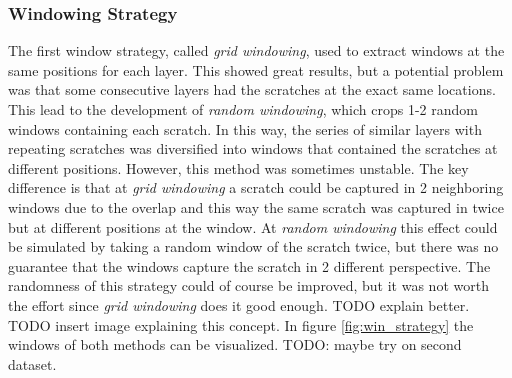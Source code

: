 \subsubsection{Windowing Strategy}
The first window strategy, called \textit{grid windowing}, used to extract windows at the same positions for each layer. This showed great results, but a potential problem was that some consecutive layers had the scratches at the exact same locations. This lead to the development of \textit{random windowing}, which crops 1-2 random windows containing each scratch. In this way, the series of similar layers with repeating scratches was diversified into windows that contained the scratches at different positions. However, this method was sometimes unstable. The key difference is that at \textit{grid windowing} a scratch could be captured in 2 neighboring windows due to the overlap and this way the same scratch was captured in twice but at different positions at the window. At \textit{random windowing} this effect could be simulated by taking a random window of the scratch twice, but there was no guarantee that the windows capture the scratch in 2 different perspective. The randomness of this strategy could of course be improved, but it was not worth the effort since \textit{grid windowing} does it good enough. TODO explain better. TODO insert image explaining this concept. In figure \ref{fig:win_strategy} the windows of both methods can be visualized.  TODO: maybe try on second dataset.

